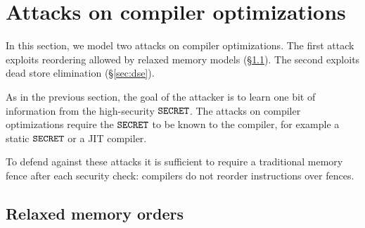 \documentclass[conference]{IEEEtran}
\theoremstyle{plain}
\theoremstyle{definition}
\begin{document}
%


\section{Attacks on compiler optimizations}
\label{sec:compiler}

In this section, we model two attacks on compiler optimizations.  The first
attack exploits reordering allowed by relaxed memory models
(\S\ref{sec:info-flow-attack}).  The second exploits dead store elimination
(\S\ref{sec:dse}).

As in the previous section, the goal of the attacker is to learn one bit of
information from the high-security $\texttt{SECRET}$.   The attacks on compiler
optimizations require the $\texttt{SECRET}$ to be known to the compiler, for example a
static $\texttt{SECRET}$ or a JIT compiler.

To defend against these attacks it is sufficient to require a traditional
memory fence after each security check: compilers do not reorder instructions
over fences.

\subsection{Relaxed memory orders}
\label{sec:info-flow-attack}
\end{document}
